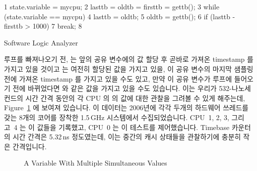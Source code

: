 \begin{listing}[tbp]
{ \scriptsize
\begin{verbbox}
  1 state.variable = mycpu;
  2 lasttb = oldtb = firsttb = gettb();
  3 while (state.variable == mycpu) {
  4   lasttb = oldtb;
  5   oldtb = gettb();
  6   if (lasttb - firsttb > 1000)
  7     break;
  8 }
\end{verbbox}
}
\centering
\theverbbox
\caption{Software Logic Analyzer}
\label{lst:memorder:Software Logic Analyzer}
\end{listing}

루프를 빠져나오기 전,  는 앞의 공유 변수에의 값 할당 후 곧바로
가져온 timestamp 를 가지고 있을 것이고  는 여전히 할당된 값을 가지고
있을, 이 공유 변수의 마지막 샘플링 전에 가져온 timestamp 를 가지고 있을 수도
있고, 만약 이 공유 변수가 루프에 들어오기 전에 바뀌었다면  와 같은
값을 가지고 있을 수도 있습니다.
이는 우리가 532-나노세컨드의 시간 간격 동안의 각 CPU 의  의
값에 대한 관찰을 그려볼 수 있게 해주는데,
Figure~\ref{fig:memorder:A Variable With Multiple Simultaneous Values} 에
보여져 있습니다.
이 데이터는 2006년에 각각 두개의 하드웨어 쓰레드를 갖는 8개의 코어를 장착한
1.5\,GHz  시스템에서 수집되었습니다.
CPU~1, 2, 3, 그리고~4 는 이 값들을 기록했고, CPU~0 는 이 테스트를 제어했습니다.
Timebase 카운터의 시간 간격은 5.32\,ns 정도였는데, 이는 중간의 캐시 상태들을
관찰하기에 충분히 작은 간격입니다.

\begin{figure}[htb]
\centering
{}
\caption{A Variable With Multiple Simultaneous Values}
\label{fig:memorder:A Variable With Multiple Simultaneous Values}
\end{figure}

